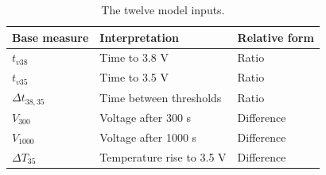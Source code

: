 \documentclass[final,5p,times,twocolumn]{elsarticle}
\begin{document}
\begin{table}[!t]\centering\scriptsize\caption{The twelve model inputs.}\label{tab:features}\begin{tabularx}{\columnwidth}{lXl}\toprule Base measure&Interpretation&Relative form\\\midrule $t_{v38}$&Time to 3.8 V&Ratio\\$t_{v35}$&Time to 3.5 V&Ratio\\$\Delta t_{38,35}$&Time between thresholds&Ratio\\$V_{300}$&Voltage after 300 s&Difference\\$V_{1000}$&Voltage after 1000 s&Difference\\$\Delta T_{35}$&Temperature rise to 3.5 V&Difference\\\bottomrule\end{tabularx}\par{}\end{table}
\end{document}
